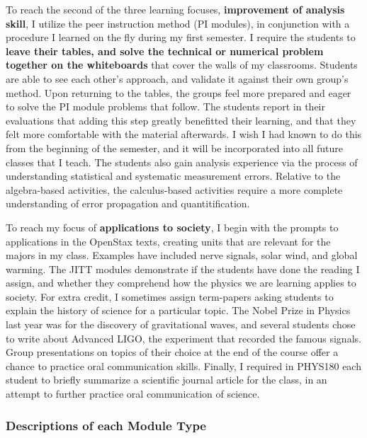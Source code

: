 \documentclass[../../../main.tex]{subfiles}
\begin{document}
To reach the second of the three learning focuses, \textbf{improvement of analysis skill}, I utilize the peer instruction method (PI modules), in conjunction with a procedure I learned on the fly during my first semester.  I require the students to \textbf{leave their tables, and solve the technical or numerical problem together on the whiteboards} that cover the walls of my classrooms.  Students are able to see each other's approach, and validate it against their own group's method.  Upon returning to the tables, the groups feel more prepared and eager to solve the PI module problems that follow.  The students report in their evaluations that adding this step greatly benefitted their learning, and that they felt more comfortable with the material afterwards.  I wish I had known to do this from the beginning of the semester, and it will be incorporated into all future classes that I teach.  The students also gain analysis experience via the process of understanding statistical and systematic measurement errors.  Relative to the algebra-based activities, the calculus-based activities require a more complete understanding of error propagation and quantitification. \\ \hspace{0.1cm}

To reach my focus of \textbf{applications to society}, I begin with the prompts to applications in the OpenStax texts, creating units that are relevant for the majors in my class.  Examples have included nerve signals, solar wind, and global warming.  The JITT modules demonstrate if the students have done the reading I assign, and whether they comprehend how the physics we are learning applies to society. For extra credit, I sometimes assign term-papers asking students to explain the history of science for a particular topic.  The Nobel Prize in Physics last year was for the discovery of gravitational waves, and several students chose to write about Advanced LIGO, the experiment that recorded the famous signals.  Group presentations on topics of their choice at the end of the course offer a chance to practice oral communication skills.  Finally, I required in PHYS180 each student to briefly summarize a scientific journal article for the class, in an attempt to further practice oral communication of science. \\ \hspace{0.1cm}

\subsubsection{Descriptions of each Module Type}
\end{document}
